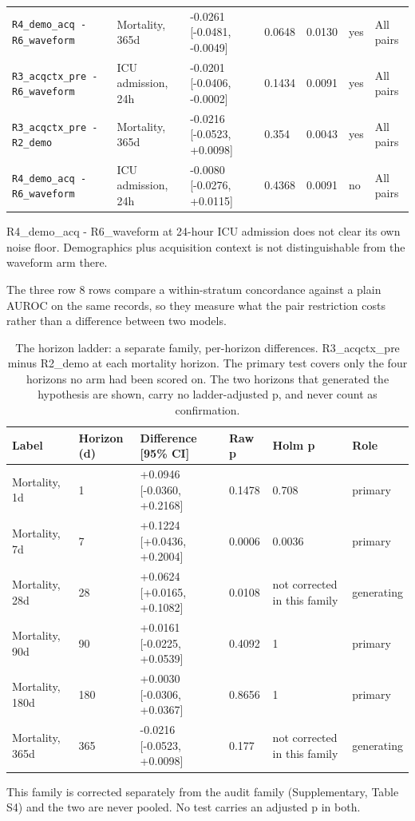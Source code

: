 \begin{table}[t]
\begin{tabular}{lllllll}
\texttt{R4\_demo\_acq - R6\_waveform} & Mortality, 365d & -0.0261 [-0.0481, -0.0049] & 0.0648 & 0.0130 & yes & All pairs \\
\texttt{R3\_acqctx\_pre - R6\_waveform} & ICU admission, 24h & -0.0201 [-0.0406, -0.0002] & 0.1434 & 0.0091 & yes & All pairs \\
\texttt{R3\_acqctx\_pre - R2\_demo} & Mortality, 365d & -0.0216 [-0.0523, +0.0098] & 0.354 & 0.0043 & yes & All pairs \\
\texttt{R4\_demo\_acq - R6\_waveform} & ICU admission, 24h & -0.0080 [-0.0276, +0.0115] & 0.4368 & 0.0091 & no & All pairs \\
\bottomrule
\end{tabular}
\par\footnotesize R4\_demo\_acq - R6\_waveform at 24-hour ICU admission does not clear its own noise floor. Demographics plus acquisition context is not distinguishable from the waveform arm there.
\par\footnotesize The three row 8 rows compare a within-stratum concordance against a plain AUROC on the same records, so they measure what the pair restriction costs rather than a difference between two models.
\end{table}

\begin{table}[t]
\centering
\small
\caption{The horizon ladder: a separate family, per-horizon differences. R3\_acqctx\_pre minus R2\_demo at each mortality horizon. The primary test covers only the four horizons no arm had been scored on. The two horizons that generated the hypothesis are shown, carry no ladder-adjusted p, and never count as confirmation.}
\label{tab:ladder_horizons}
\begin{tabular}{llllll}
\toprule
Label & Horizon (d) & Difference [95\% CI] & Raw p & Holm p & Role \\
\midrule
Mortality, 1d & 1 & +0.0946 [-0.0360, +0.2168] & 0.1478 & 0.708 & primary \\
Mortality, 7d & 7 & +0.1224 [+0.0436, +0.2004] & 0.0006 & 0.0036 & primary \\
Mortality, 28d & 28 & +0.0624 [+0.0165, +0.1082] & 0.0108 & not corrected in this family & generating \\
Mortality, 90d & 90 & +0.0161 [-0.0225, +0.0539] & 0.4092 & 1 & primary \\
Mortality, 180d & 180 & +0.0030 [-0.0306, +0.0367] & 0.8656 & 1 & primary \\
Mortality, 365d & 365 & -0.0216 [-0.0523, +0.0098] & 0.177 & not corrected in this family & generating \\
\bottomrule
\end{tabular}
\par\footnotesize This family is corrected separately from the audit family (Supplementary, Table S4) and the two are never pooled. No test carries an adjusted p in both.
\end{table}

